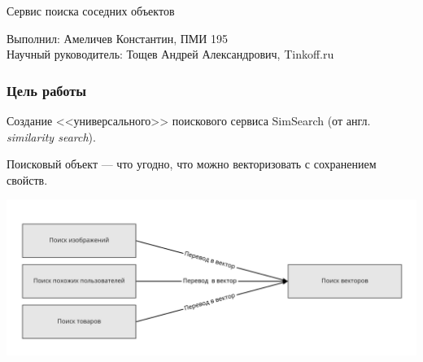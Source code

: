 \documentclass{beamer}
\begin{document}
\date{25 июня, 2022}


\begin{frame}
\begin{center}


{\large \scshape

\bigskip

\bigskip

Сервис поиска соседних объектов

\bigskip
\bigskip
\bigskip
\bigskip
\bigskip
\bigskip
}



Выполнил: Амеличев Константин, ПМИ 195\\
\bigskip
Научный руководитель: Тощев Андрей Александрович, Tinkoff.ru


\end{center}
\end{frame}






\begin{frame}

\frametitle{Цель работы}

Создание <<универсального>> поискового сервиса SimSearch (от англ. \textit{similarity search}).

\bigskip

Поисковый объект --- что угодно, что можно векторизовать с сохранением свойств.

\begin{center}
\includegraphics[width=0.8\linewidth]{img/search_problem_approach.png}
\end{center}


\end{frame}
\end{document}
